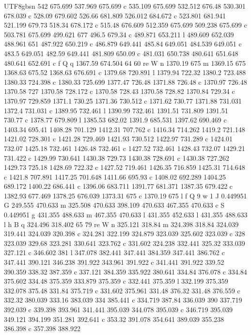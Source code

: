 \documentclass[11pt,a4paper,oneside]{report}
\begin{document}
\begin{CJK*}{UTF8}{gbsn}
{542 675.699 537.969 675.699 c 535.109 675.699 532.512 676.48 530.301 678.039 c 528.09 679.602 526.66
681.809 526.012 684.672 c 523.801 681.941 521.199 679.73 518.34 678.172 c 515.48 676.609 512.359 675.699
509.238 675.699 c 503.781 675.699 499.621 677 496.5 679.34 c 489.871 653.211 l 489.609 652.039 488.961
651 487.922 650.219 c 486.879 649.441 485.84 649.051 484.539 649.051 c 483.5 649.051 482.59 649.441
481.809 650.09 c 481.031 650.738 480.641 651.648 480.641 652.691 c f Q q 1367.59 674.504 64 60 re W n
1370.19 675 m 1369.15 675 1368.63 675.52 1368.63 676.691 c 1379.68 720.891 l 1379.94 722.32 1380.2
723.488 1380.33 724.398 c 1380.33 725.699 1377.47 726.48 1371.88 726.48 c 1370.97 726.48 1370.58 727
1370.58 728.172 c 1370.58 728.43 1370.58 728.82 1370.84 729.34 c 1370.97 729.859 1371.1 730.25 1371.36
730.512 c 1371.62 730.77 1371.88 731.031 1372.4 731.031 c 1389.95 732.461 l 1390.99 732.461 1391.51
731.809 1391.51 730.77 c 1378.77 679.809 l 1385.53 682.02 1391.9 685.531 1397.62 690.469 c 1403.34 695.41
1408.28 701.129 1412.31 707.762 c 1416.34 714.262 1419.2 721.148 1421.02 728.301 c 1421.28 729.469
1421.93 730.512 1422.97 731.289 c 1424.01 732.07 1425.18 732.461 1426.48 732.461 c 1427.52 732.461
1428.43 732.07 1429.21 731.422 c 1429.99 730.641 1430.38 729.73 1430.38 728.691 c 1430.38 727.262 1429.73
725.18 1428.69 722.32 c 1427.52 719.461 1426.35 716.859 1425.31 714.648 c 1421.8 707.891 1417.25 701.648
1411.66 695.93 c 1408.02 692.289 1404.25 689.172 1400.22 686.441 c 1396.06 683.711 1391.77 681.371
1387.35 679.422 c 1382.93 677.469 1378.25 676.039 1373.31 675 c 1370.19 675 l f Q 9 w 1 J 0.449951 G
249.555 470.633 m 325.508 470.633 398.109 470.633 467.355 470.633 c S 0.449951 g 431.355 488.633 m
467.355 470.633 l 431.355 452.633 l 431.355 488.633 l h B q 324.496 318.402 65 79 re W n 325.121 318.84 m
324.398 318.84 324.039 319.441 324.039 320.398 c 324.281 322.199 324.879 323.039 325.602 323.039 c 328
323.039 329.68 323.281 330.641 323.762 c 331.602 324.238 332.441 325.32 333.039 327.121 c 346.602 381 l
347.078 382.441 347.441 384.359 347.441 386.762 c 347.441 390.121 346.238 391.922 343.961 391.922 c
341.441 391.922 339.52 390.359 338.32 387.359 c 337.121 384.359 335.922 380.641 334.84 376.078 c 334.84
375.602 334.48 375.359 333.879 375.359 c 332.441 375.359 l 332.199 375.359 332.078 375.48 331.84 375.719
c 331.602 375.961 331.48 376.32 331.48 376.559 c 332.32 380.039 333.16 383.039 334 385.441 c 334.719
387.84 336.039 390 337.719 392.039 c 339.398 393.961 341.441 395.039 344.078 395.039 c 346.719 395.039
349.121 394.199 351.281 392.641 c 353.32 391.078 354.641 389.039 355.238 386.398 c 357.398 388.922
}
\end{CJK*}
\end{document}

